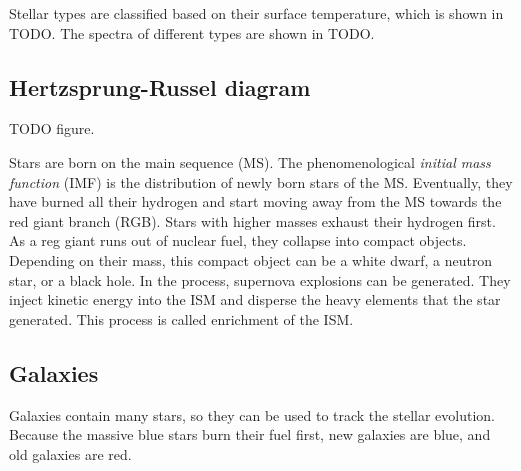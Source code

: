 Stellar types are classified based on their surface temperature, which is shown in TODO.
The spectra of different types are shown in TODO.

\subsection{Hertzsprung-Russel diagram}

TODO figure.

Stars are born on the main sequence (MS).
The phenomenological \emph{initial mass function} (IMF) is the distribution of newly born stars of the MS.
Eventually, they have burned all their hydrogen and start moving away from the MS towards the red giant branch (RGB).
Stars with higher masses exhaust their hydrogen first.
As a reg giant runs out of nuclear fuel, they collapse into compact objects. Depending on their mass, this compact object can be a white dwarf, a neutron star, or a black hole.
In the process, supernova explosions can be generated.
They inject kinetic energy into the ISM and disperse the heavy elements that the star generated.
This process is called enrichment of the ISM.

\subsection{Galaxies}
Galaxies contain many stars, so they can be used to track the stellar evolution.
Because the massive blue stars burn their fuel first, new galaxies are blue, and old galaxies are red.










